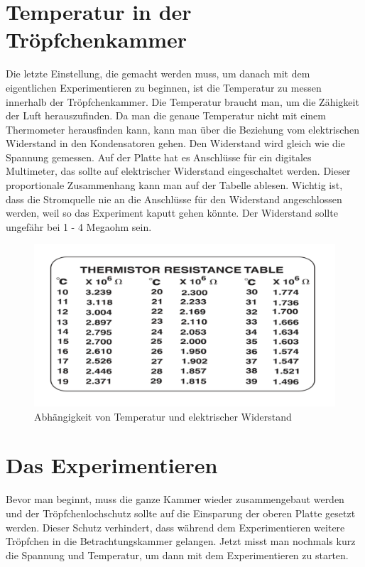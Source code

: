 \section{Temperatur in der Tröpfchenkammer}\label{sec:Temperatur}
Die letzte Einstellung, die gemacht werden muss, um danach mit dem eigentlichen Experimentieren zu beginnen, ist die Temperatur zu messen innerhalb der Tröpfchenkammer. Die Temperatur braucht man, um die Zähigkeit der Luft herauszufinden. Da man die genaue Temperatur nicht mit einem Thermometer herausfinden kann, kann man über die Beziehung vom elektrischen Widerstand in den Kondensatoren gehen. Den Widerstand wird gleich wie die Spannung gemessen. Auf der Platte hat es Anschlüsse für ein digitales Multimeter, das sollte auf elektrischer Widerstand eingeschaltet werden. Dieser proportionale Zusammenhang kann man auf der Tabelle ablesen. Wichtig ist, dass die Stromquelle nie an die Anschlüsse für den Widerstand angeschlossen werden, weil so das Experiment kaputt gehen könnte. Der Widerstand sollte ungefähr bei 1 - 4 Megaohm sein.

\begin{figure}[ht]
	\begin{center}
		\includegraphics[scale=0.25]{bilder/pdf/TemperaturTabelle.pdf}
		\caption{Abhängigkeit von Temperatur und elektrischer Widerstand}
		\label{fig:widerstandTemperatur}
	\end{center}
\end{figure}

\section{Das Experimentieren}\label{sec:durchfuehrung}
Bevor man beginnt, muss die ganze Kammer wieder zusammengebaut werden und der Tröpfchenlochschutz sollte auf die Einsparung der oberen Platte gesetzt werden. Dieser Schutz verhindert, dass während dem Experimentieren weitere Tröpfchen in die Betrachtungskammer gelangen. Jetzt misst man nochmals kurz die Spannung und Temperatur, um dann mit dem Experimentieren zu starten.

